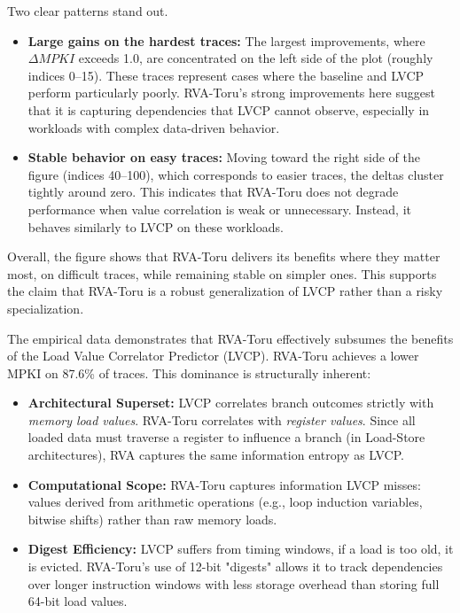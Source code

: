 \documentclass[11pt,a4paper]{article}
\begin{document}
Two clear patterns stand out.

\begin{itemize}
    \item \textbf{Large gains on the hardest traces:} The largest improvements, where $\Delta MPKI$ exceeds 1.0, are concentrated on the left side of the plot (roughly indices 0–15). These traces represent cases where the baseline and LVCP perform particularly poorly. RVA-Toru’s strong improvements here suggest that it is capturing dependencies that LVCP cannot observe, especially in workloads with complex data-driven behavior.
    
    \item \textbf{Stable behavior on easy traces:} Moving toward the right side of the figure (indices 40–100), which corresponds to easier traces, the deltas cluster tightly around zero. This indicates that RVA-Toru does not degrade performance when value correlation is weak or unnecessary. Instead, it behaves similarly to LVCP on these workloads.
\end{itemize}

Overall, the figure shows that RVA-Toru delivers its benefits where they matter most, on difficult traces, while remaining stable on simpler ones. This supports the claim that RVA-Toru is a robust generalization of LVCP rather than a risky specialization.

The empirical data demonstrates that RVA-Toru effectively subsumes the benefits of the Load Value Correlator Predictor (LVCP). RVA-Toru achieves a lower MPKI on 87.6\% of traces. This dominance is structurally inherent:

\begin{itemize}
    \item \textbf{Architectural Superset:} LVCP correlates branch outcomes strictly with \textit{memory load values}. RVA-Toru correlates with \textit{register values}. Since all loaded data must traverse a register to influence a branch (in Load-Store architectures), RVA captures the same information entropy as LVCP.
    \item \textbf{Computational Scope:} RVA-Toru captures information LVCP misses: values derived from arithmetic operations (e.g., loop induction variables, bitwise shifts) rather than raw memory loads.
    \item \textbf{Digest Efficiency:} LVCP suffers from timing windows, if a load is too old, it is evicted. RVA-Toru's use of 12-bit "digests" allows it to track dependencies over longer instruction windows with less storage overhead than storing full 64-bit load values.
\end{itemize}
\end{document}

